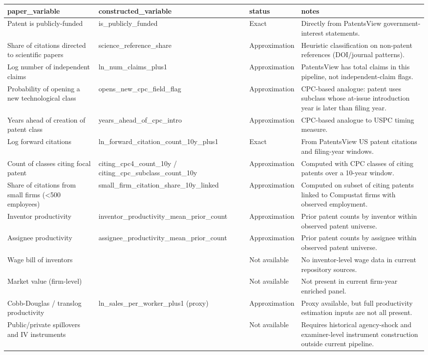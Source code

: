 \begin{tabular}{llll}
\toprule
paper_variable & constructed_variable & status & notes \\
\midrule
Patent is publicly-funded & is_publicly_funded & Exact & Directly from PatentsView government-interest statements. \\
Share of citations directed to scientific papers & science_reference_share & Approximation & Heuristic classification on non-patent references (DOI/journal patterns). \\
Log number of independent claims & ln_num_claims_plus1 & Approximation & PatentsView has total claims in this pipeline, not independent-claim flags. \\
Probability of opening a new technological class & opens_new_cpc_field_flag & Approximation & CPC-based analogue: patent uses subclass whose at-issue introduction year is later than filing year. \\
Years ahead of creation of patent class & years_ahead_of_cpc_intro & Approximation & CPC-based analogue to USPC timing measure. \\
Log forward citations & ln_forward_citation_count_10y_plus1 & Exact & From PatentsView US patent citations and filing-year windows. \\
Count of classes citing focal patent & citing_cpc4_count_10y / citing_cpc_subclass_count_10y & Approximation & Computed with CPC classes of citing patents over a 10-year window. \\
Share of citations from small firms (<500 employees) & small_firm_citation_share_10y_linked & Approximation & Computed on subset of citing patents linked to Compustat firms with observed employment. \\
Inventor productivity & inventor_productivity_mean_prior_count & Approximation & Prior patent counts by inventor within observed patent universe. \\
Assignee productivity & assignee_productivity_mean_prior_count & Approximation & Prior patent counts by assignee within observed patent universe. \\
Wage bill of inventors &  & Not available & No inventor-level wage data in current repository sources. \\
Market value (firm-level) &  & Not available & Not present in current firm-year enriched panel. \\
Cobb-Douglas / translog productivity & ln_sales_per_worker_plus1 (proxy) & Approximation & Proxy available, but full productivity estimation inputs are not all present. \\
Public/private spillovers and IV instruments &  & Not available & Requires historical agency-shock and examiner-level instrument construction outside current pipeline. \\
\bottomrule
\end{tabular}
